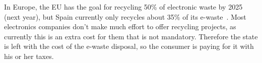 \documentclass[12pt, letterpaper]{article}
\begin{document}
In Europe, the EU has the goal for recycling 50\% of electronic waste
by 2025 (next year), but Spain currently only recycles about 35\% of
its e-waste~\autocite{miogas-2024}. Most electronics companies don't make much
effort to offer recycling
projects, as currently this is an extra cost for them that is not
mandatory. Therefore the state is left with the cost of the e-waste
disposal, so the consumer is paying for it with his or her taxes.

\printbibliography[heading=bibintoc,title=References]
\end{document}
